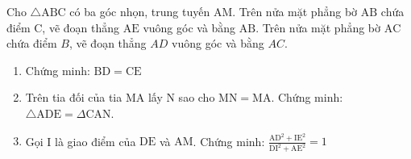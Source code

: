 \begin{bt}
    Cho $\triangle \mathrm{ABC}$ có ba góc nhọn, trung tuyến $\mathrm{AM}$. Trên nửa mặt phẳng bờ $\mathrm{AB}$ chứa điểm $\mathrm{C}$, vẽ đoạn thẳng $\mathrm{AE}$ vuông góc và bằng $\mathrm{AB}$. Trên nửa mặt phẳng bờ $\mathrm{AC}$ chứa điểm $B$, vẽ đoạn thẳng $A D$ vuông góc và bằng $A C$.

\begin{enumerate}
    \item Chứng minh: $\mathrm{BD}=\mathrm{CE}$
    \item Trên tia đối của tia MA lấy $\mathrm{N}$ sao cho $\mathrm{MN}=\mathrm{MA}$. Chứng minh: $\triangle \mathrm{ADE}=\Delta \mathrm{CAN}$.
    \item Gọi I là giao điểm của $\mathrm{DE}$ và $\mathrm{AM}$. Chứng minh: $\frac{\mathrm{AD}^2+\mathrm{IE}^2}{\mathrm{DI}^2+\mathrm{AE}^2}=1$
\end{enumerate}
\end{bt}
